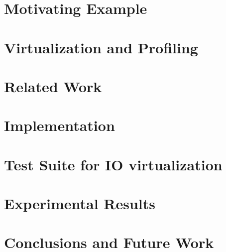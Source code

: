 \documentclass[10pt,twocolumn,oneside]{article}
\begin{document}
\section{Motivating Example}


\section{Virtualization and Profiling}


\section{Related Work}


\section{Implementation}


\section{Test Suite for IO virtualization}


\section{Experimental Results}


\section{Conclusions and Future Work}


\end{document}

